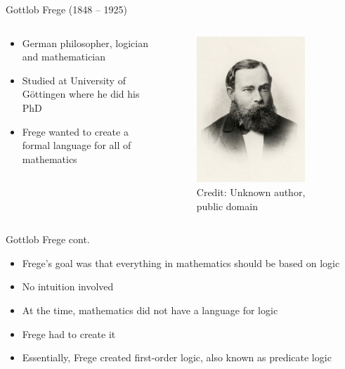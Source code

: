 \documentclass[utf8]{beamer}
\begin{document}
\begin{frame}{Gottlob Frege (1848 – 1925)}
\begin{columns}
\begin{column}{0.6\textwidth}
\begin{itemize}
\item German philosopher, logician and mathematician
\item Studied at University of G{\"o}ttingen where he did his PhD
\item Frege wanted to create a formal language for all of mathematics
\end{itemize}
\end{column}
\begin{column}{0.4\textwidth}
\begin{figure}
\centering
\includegraphics[width=0.8\textwidth]{images/frege.jpg}
\\
\tiny Credit: Unknown author, public domain
\end{figure}
\end{column}
\end{columns}
\end{frame}

\begin{frame}{Gottlob Frege cont.}
\begin{itemize}
\item Frege's goal was that everything in mathematics should be based on logic
\item No intuition involved
\item At the time, mathematics did not have a language for logic
\item Frege had to create it
\item Essentially, Frege created first-order logic, also known as predicate logic
\end{itemize}
\end{frame}
\end{document}
